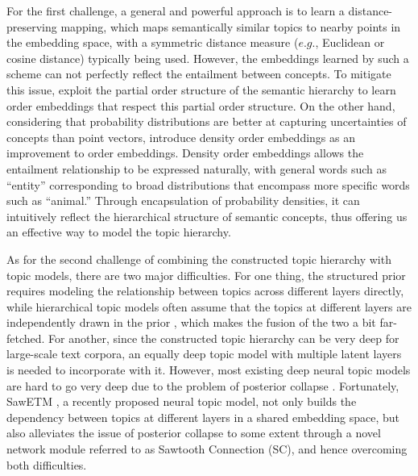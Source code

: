 \documentclass{article}
\begin{document}
For the first challenge, a general and powerful approach \cite{chopra2005learning} is to learn a distance-preserving mapping, which maps semantically similar topics to nearby points in the embedding space, with a symmetric distance measure ($e.g.$, Euclidean or cosine distance) typically being used. However, the embeddings learned by such a scheme can not perfectly reflect the entailment between concepts. To mitigate this issue,  \citet{vendrov2015order} exploit the partial order structure of the semantic hierarchy %
to learn order embeddings that respect this partial order structure. On the other hand, considering that probability distributions are better at capturing uncertainties of concepts than point vectors, \citet{athiwaratkun2018hierarchical} introduce density order embeddings as an improvement to order embeddings. Density order embeddings allows the entailment relationship to be expressed naturally, with general words such as “entity” corresponding to broad distributions that encompass more specific words such as “animal.” Through encapsulation of probability densities, it can intuitively reflect the hierarchical structure of semantic concepts, thus offering us an effective way to model the topic hierarchy.

As for the second challenge of combining the constructed topic hierarchy with topic models, there are two major difficulties. For one thing, the structured prior requires modeling the relationship between topics across different layers directly, while hierarchical topic models often assume that the topics at different layers are independently drawn in the prior \cite{zhou2016augmentable}, which makes the fusion of the two a bit far-fetched. For another, since the constructed topic hierarchy can be very deep for large-scale text corpora, an equally deep topic model with multiple latent layers is needed to incorporate with it. However, most existing deep neural topic models are hard to go very deep due to the problem of posterior collapse \cite{2016Variational,2016A,2017Neural,2017Towards,sonderby2016ladder, zhang2018whai, duan2021sawtooth}. Fortunately, SawETM \cite{duan2021sawtooth}, a recently proposed neural topic model, not only
builds the dependency between topics at different layers in a shared embedding space, but also alleviates the issue of posterior collapse to some extent through a novel network module referred to as Sawtooth Connection (SC), 
and hence overcoming both difficulties. 
\end{document}
